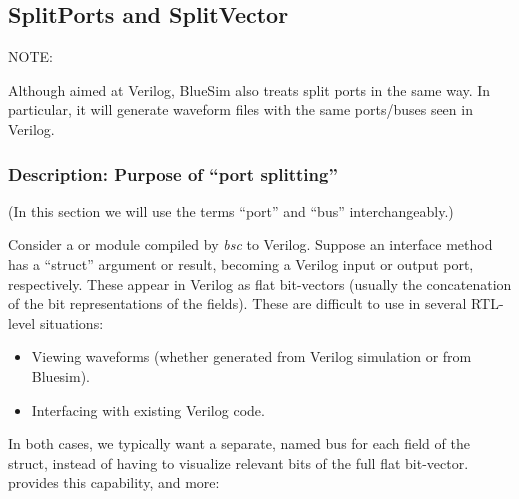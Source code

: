 
\subsection{SplitPorts and SplitVector}

\label{sec-SplitPorts-package}


NOTE: \hfill {}

{\footnotesize Although aimed at Verilog, BlueSim also treats split
  ports in the same way. In particular, it will generate waveform
  files with the same ports/buses seen in Verilog.}


\subsubsection{Description: Purpose of ``port splitting''}


{\footnotesize (In this section we will use the terms ``port'' and ``bus'' interchangeably.)}

Consider a {\BHb} or {\BSVb} module compiled by \emph{bsc} to
Verilog. Suppose an interface method has a ``struct'' argument or
result, becoming a Verilog input or output port, respectively.  These
appear in Verilog as flat bit-vectors (usually the concatenation of
the bit representations of the fields).  These are difficult to use in
several RTL-level situations:

\begin{itemize}
  \item Viewing waveforms (whether generated from Verilog simulation or from Bluesim).
  \item Interfacing with existing Verilog code.
\end{itemize}

In both cases, we typically want a separate, named bus for each field
of the struct, instead of having to visualize relevant bits of the
full flat bit-vector.   provides this capability, and
more:

